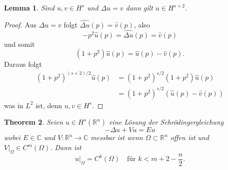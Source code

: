 \documentclass[
paper=a4,
bibtotocnumbered,
liststotocnumbered,
tablecaptionabove,
pointlessnumbers,
twoside,
openright,
10pt
]
{report}
\newtheorem{thm}{Theorem}[chapter]
\newtheorem{lem}[thm]{Lemma}
\theoremstyle{definition}
\numberwithin{equation}{chapter}
\begin{document}
\begin{lem}
Sind $u,v\in H^s$ und $\Delta u=v$ dann gilt $u\in H^{s+2}$.
\end{lem}
\begin{proof}
Aus $\Delta u=v$ folgt $\widehat{\Delta u} (p) = \hat v(p)$, also
\begin{equation}
-p^2 \hat u(p) = \widehat{\Delta u} (p) = \hat v(p)
\end{equation}
und somit
\begin{equation}
(1+p^2) \hat u(p) = \hat u(p) - \hat v(p).
\end{equation}
Daraus folgt
\begin{align}
(1+p^2)^{(s+2)/2} \hat u(p) &= (1+p^2)^{s/2} (1+p^2) \hat u(p) \\
&= (1+p^2)^{s/2} (\hat u(p) -  \hat v(p))
\end{align}
was in $L^2$ ist, denn $u,v\in H^s$.
\end{proof}
\begin{thm}\label{4.9}
Seien $u\in H^s(\mathbb R^n)$ eine Lösung der Schrödingergleichung
\begin{equation}
-\Delta u + Vu = Eu
\end{equation}
wobei $E\in \mathbb C$ und $V: \mathbb R^n\to \mathbb C$ messbar ist wenn $\Omega \subset \mathbb R^n$ offen ist und $V\big|_\Omega \in C^m(\Omega)$. Dann ist
\begin{equation}
u\big|_\Omega = C^k(\Omega) \quad \text{für } k<m+2-\frac{n}{2}.
\end{equation}
\end{thm}
\end{document}

